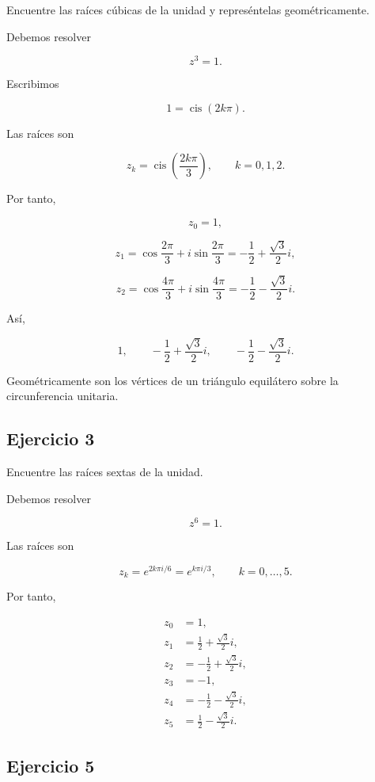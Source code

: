 \documentclass[12pt]{article}
\begin{document}
Encuentre las raíces cúbicas de la unidad y represéntelas
geométricamente.

Debemos resolver

\[
z^3=1.
\]

Escribimos

\[
1=\operatorname{cis}(2k\pi).
\]

Las raíces son

\[
z_k
=
\operatorname{cis}
\left(
\frac{2k\pi}{3}
\right),
\qquad
k=0,1,2.
\]

Por tanto,

\[
z_0=1,
\]

\[
z_1
=
\cos\frac{2\pi}{3}
+
i\sin\frac{2\pi}{3}
=
-\frac12+\frac{\sqrt3}{2}i,
\]

\[
z_2
=
\cos\frac{4\pi}{3}
+
i\sin\frac{4\pi}{3}
=
-\frac12-\frac{\sqrt3}{2}i.
\]

Así,

\[
\boxed{
1,\qquad
-\frac12+\frac{\sqrt3}{2}i,\qquad
-\frac12-\frac{\sqrt3}{2}i
}.
\]

Geométricamente son los vértices de un triángulo equilátero sobre la
circunferencia unitaria.


\subsection*{Ejercicio 3}

Encuentre las raíces sextas de la unidad.

Debemos resolver

\[
z^6=1.
\]

Las raíces son

\[
z_k
=
e^{2k\pi i/6}
=
e^{k\pi i/3},
\qquad
k=0,\ldots,5.
\]

Por tanto,

\[
\boxed{
\begin{aligned}
z_0&=1,\\
z_1&=\frac12+\frac{\sqrt3}{2}i,\\
z_2&=-\frac12+\frac{\sqrt3}{2}i,\\
z_3&=-1,\\
z_4&=-\frac12-\frac{\sqrt3}{2}i,\\
z_5&=\frac12-\frac{\sqrt3}{2}i.
\end{aligned}
}
\]


\subsection*{Ejercicio 5}
\end{document}
